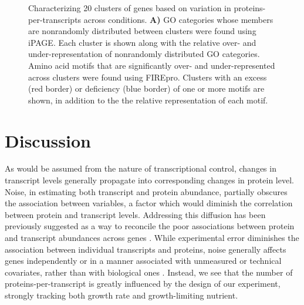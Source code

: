 \begin{figure}[h!]
\begin{center}
\hspace{1mm}
\caption[Characterizing 20 clusters of genes based on variation in proteins-per-transcripts across conditions]{Characterizing 20 clusters of genes based on variation in proteins-per-transcripts across conditions. \textbf{A)} GO categories whose members are nonrandomly distributed between clusters were found using iPAGE. Each cluster is shown along with the relative over- and under-representation of nonrandomly distributed GO categories. Amino acid motifs that are significantly over- and under-represented across clusters were found using FIREpro. Clusters with an excess (red border) or deficiency (blue border) of one or more motifs are shown, in addition to the  the relative representation of each motif.}
\label{ch-pta:fire_page}
\end{center}
\end{figure}


\section{Discussion}

As would be assumed from the nature of transcriptional control, changes in transcript levels generally propagate into corresponding changes in protein level.  Noise, in estimating both transcript and protein abundance, partially obscures the association between variables, a factor which would diminish the correlation between protein and transcript levels. Addressing this diffusion has been previously suggested as a way to reconcile the poor associations between protein and transcript abundances across genes \cite{Csardi:2015kx}.  While experimental error diminishes the association between individual transcripts and proteins, noise generally affects genes independently or in a manner associated with unmeasured or technical covariates, rather than with biological ones \cite{Leek:2007kn}. Instead, we see that the number of proteins-per-transcript is greatly influenced by the design of our experiment, strongly tracking both growth rate and growth-limiting nutrient.


